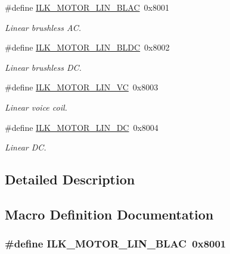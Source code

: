 \begin{DoxyCompactItemize}
\#define \hyperlink{group__IL__CONST__MOTOR_ga4e9537c5560f52a0c69d5cfe9e06f4af}{I\+L\+K\+\_\+\+M\+O\+T\+O\+R\+\_\+\+L\+I\+N\+\_\+\+B\+L\+AC}~0x8001
\begin{DoxyCompactList}\small\item\em Linear brushless AC. \end{DoxyCompactList}\item 
\#define \hyperlink{group__IL__CONST__MOTOR_gafb0b611a2644cf1673896daf236b69b7}{I\+L\+K\+\_\+\+M\+O\+T\+O\+R\+\_\+\+L\+I\+N\+\_\+\+B\+L\+DC}~0x8002
\begin{DoxyCompactList}\small\item\em Linear brushless DC. \end{DoxyCompactList}\item 
\#define \hyperlink{group__IL__CONST__MOTOR_gad90b5df2f58dc0a6ff0452abdc0f0e22}{I\+L\+K\+\_\+\+M\+O\+T\+O\+R\+\_\+\+L\+I\+N\+\_\+\+VC}~0x8003
\begin{DoxyCompactList}\small\item\em Linear voice coil. \end{DoxyCompactList}\item 
\#define \hyperlink{group__IL__CONST__MOTOR_ga023e91fb0fb03bd5273e90c1399336f9}{I\+L\+K\+\_\+\+M\+O\+T\+O\+R\+\_\+\+L\+I\+N\+\_\+\+DC}~0x8004\hypertarget{group__IL__CONST__MOTOR_ga023e91fb0fb03bd5273e90c1399336f9}{}\label{group__IL__CONST__MOTOR_ga023e91fb0fb03bd5273e90c1399336f9}

\begin{DoxyCompactList}\small\item\em Linear DC. \end{DoxyCompactList}\end{DoxyCompactItemize}


\subsection{Detailed Description}


\subsection{Macro Definition Documentation}
\subsubsection[{\texorpdfstring{I\+L\+K\+\_\+\+M\+O\+T\+O\+R\+\_\+\+L\+I\+N\+\_\+\+B\+L\+AC}{ILK_MOTOR_LIN_BLAC}}]{\setlength{\rightskip}{0pt plus 5cm}\#define I\+L\+K\+\_\+\+M\+O\+T\+O\+R\+\_\+\+L\+I\+N\+\_\+\+B\+L\+AC~0x8001}\hypertarget{group__IL__CONST__MOTOR_ga4e9537c5560f52a0c69d5cfe9e06f4af}{}\label{group__IL__CONST__MOTOR_ga4e9537c5560f52a0c69d5cfe9e06f4af}


